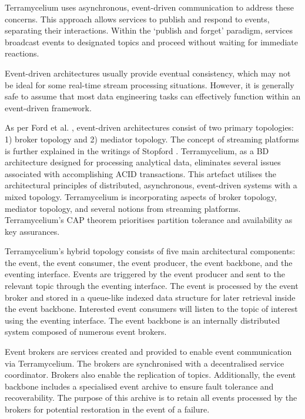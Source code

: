 \documentclass[preprint,12pt]{elsarticle}
\begin{document}
Terramycelium uses asynchronous, event-driven communication to address these concerns. This approach allows services to publish and respond to events, separating their interactions. Within the `publish and forget' paradigm, services broadcast events to designated topics and proceed without waiting for immediate reactions.

Event-driven architectures usually provide eventual consistency, which may not be ideal for some real-time stream processing situations. However, it is generally safe to assume that most data engineering tasks can effectively function within an event-driven framework.

As per Ford et al. \cite{Ford2021SoftwareArchitecture}, event-driven architectures consist of two primary topologies: 1) broker topology and 2) mediator topology. The concept of streaming platforms is further explained in the writings of Stopford \cite{stopford2018designing}. Terramycelium, as a BD architecture designed for processing analytical data, eliminates several issues associated with accomplishing ACID transactions. This artefact utilises the architectural principles of distributed, asynchronous, event-driven systems with a mixed topology. Terramycelium is incorporating aspects of broker topology, mediator topology, and several notions from streaming platforms. Terramycelium's CAP theorem \cite{simon2000brewer} prioritises partition tolerance and availability as key assurances. 

Terramycelium's hybrid topology consists of five main architectural components: the event, the event consumer, the event producer, the event backbone, and the eventing interface. Events are triggered by the event producer and sent to the relevant topic through the eventing interface. The event is processed by the event broker and stored in a queue-like indexed data structure for later retrieval inside the event backbone. Interested event consumers will listen to the topic of interest using the eventing interface. The event backbone is an internally distributed system composed of numerous event brokers. 

Event brokers are services created and provided to enable event communication via Terramycelium. The brokers are synchronised with a decentralised service coordinator. Brokers also enable the replication of topics. Additionally, the event backbone includes a specialised event archive to ensure fault tolerance and recoverability. The purpose of this archive is to retain all events processed by the brokers for potential restoration in the event of a failure. 
\end{document}
